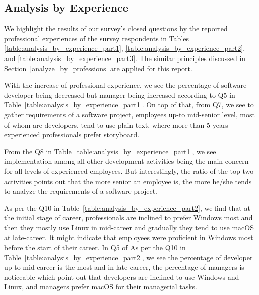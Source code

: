 \subsection{Analysis by Experience}

We highlight the results of our survey's closed questions by the reported professional experiences of the survey respondents in Tables \ref{table:analysis_by_experience_part1}, \ref{table:analysis_by_experience_part2}, and \ref{table:analysis_by_experience_part3}. The similar principles discussed in Section~\ref{analyze_by_professions} are applied for this report.





With the increase of professional experience, we see the percentage of software developer being decreased but manager being increased according to Q5 in Table~\ref{table:analysis_by_experience_part1}. On top of that, from Q7, we see to gather requirements of a software project, employees up-to mid-senior level, most of whom are developers, tend to use plain text, where more than 5 years experienced professionals prefer storyboard.

From the Q8 in Table~\ref{table:analysis_by_experience_part1}, we see implementation among all other development activities being the main concern for all levels of experienced employees. But interestingly, the ratio of the top two activities points out that the more senior an employee is, the more he/she tends to analyze the requirements of a software project.

As per the Q10 in Table~\ref{table:analysis_by_experience_part2}, we find that at the initial stage of career, professionals are inclined to prefer Windows most and then they mostly use Linux in mid-career and gradually they tend to use macOS at late-career. It might indicate that employees were proficient in Windows most before the start of their career. In Q5 of As per the Q10 in Table~\ref{table:analysis_by_experience_part2}, we see the percentage of developer up-to mid-career is the most and in late-career, the percentage of managers is noticeable which point out that developers are inclined to use Windows and Linux, and managers prefer macOS for their managerial tasks.

